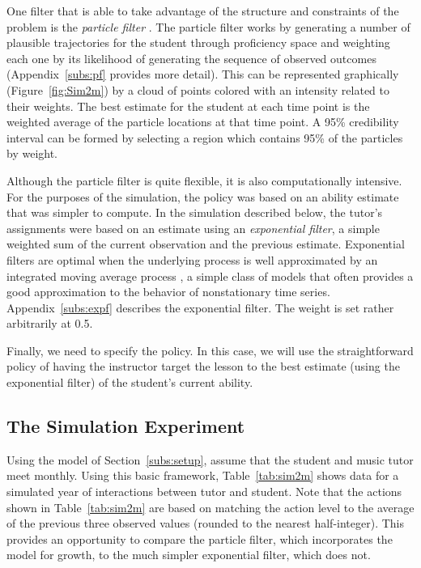 \documentclass[12pt]{RR-article}
\begin{document}
One filter that is able to take advantage of the structure and
constraints of the problem is the \textit{particle filter}
\cite{Doucet2001,Liu2001}.  The particle filter works by generating a
number of plausible trajectories for the student through proficiency
space and weighting each one by its likelihood of generating the
sequence of observed outcomes (Appendix~\ref{subs:pf} provides more
detail).  This can be represented graphically (Figure~\ref{fig:Sim2m})
by a cloud of points colored with an intensity related to their
weights.  The best estimate for the student at each time point is the
weighted average of the particle locations at that time point.  A 95\%
credibility interval can be formed by selecting a region which
contains 95\% of the particles by weight.

Although the particle filter is quite flexible, it is also
computationally intensive.  For the purposes of the simulation, the
policy was based on an ability estimate that was simpler to compute.
In the simulation described below, the tutor's assignments were based
on an estimate using an \textit{exponential filter}, a simple weighted
sum of the current observation and the previous estimate.  Exponential
filters are optimal when the underlying process is well approximated
by an integrated moving average process \cite{BoxJenkins}, a simple
class of models that often provides a good approximation to the
behavior of nonstationary time series.  Appendix~\ref{subs:expf}
describes the exponential filter.  The weight is set rather
arbitrarily at 0.5.

Finally, we need to specify the policy.  In this case, we will use the
straightforward policy of having the instructor target the lesson to
the best estimate (using the exponential filter) of the student's
current ability.

\subsection{The Simulation Experiment}
\label{subs:statement}

Using the model of Section~\ref{subs:setup}, assume that the student
and music tutor meet monthly.  Using this basic framework,
Table~\ref{tab:sim2m} shows data for a simulated year of interactions
between tutor and student.  Note that the actions shown in
Table~\ref{tab:sim2m} are based on matching the action level to the
average of the previous three observed values (rounded to the nearest
half-integer).  This provides an opportunity to compare the particle
filter, which incorporates the model for growth, to the much simpler
exponential filter, which does not.
\end{document}

